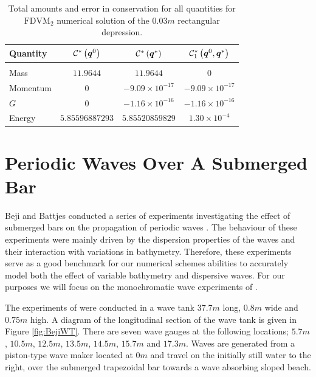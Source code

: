 \begin{table}
	\centering
	\begin{tabular}{l  c  c c}
		Quantity& $\mathcal{C}^*\left(\boldsymbol{q}^0\right)$ & $\mathcal{C}^*\left(\boldsymbol{q}^*\right)$ & $\mathcal{C}^*_1\left(\boldsymbol{q}^0,\boldsymbol{q}^*\right)$ \\
		\hline &&& \\
		Mass & $11.9644$ & $11.9644$ & $0$\\
		Momentum & $0$ & $-9.09 \times 10^{-17}$ & $-9.09 \times 10^{-17}$\\
		$G$ & $0$ & $-1.16\times 10^{-16}$ & $-1.16\times 10^{-16}$\\
		Energy & $5.85596887293$ & $5.85520859829 $ & $1.30 \times 10^{-4}$ \\
	\end{tabular}
	\caption{Total amounts and error in conservation for all quantities for $\text{FDVM}_2$ numerical solution of the $0.03m$ rectangular depression.}
	\label{tab:ConservationSegurFDVM3cm}
\end{table}  


\section{Periodic Waves Over A Submerged Bar}
\label{sec:PeriodicWavessubBar}
Beji and Battjes conducted a series of experiments investigating the effect of submerged bars on the propagation of periodic waves \cite{Beji-Battjes-1993-151,Beji-Battjes-1994-1}. The behaviour of these experiments were mainly driven by the dispersion properties of the waves and their interaction with variations in bathymetry. Therefore, these experiments serve as a good benchmark for our numerical schemes abilities to accurately model both the effect of variable bathymetry and dispersive waves. For our purposes we will focus on the monochromatic wave experiments of \citet{Beji-Battjes-1994-1}.

The experiments of \citet{Beji-Battjes-1994-1} were conducted in a wave tank $37.7m$ long, $0.8m$ wide and $0.75m$ high. A diagram of the longitudinal section of the wave tank is given in Figure \ref{fig:BejiWT}. There are seven wave gauges at the following locations; $5.7m$, $10.5m$, $12.5m$, $13.5m$, $14.5m$, $15.7m$ and $17.3m$. Waves are generated from a piston-type wave maker located at $0m$ and travel on the initially still water to the right, over the submerged trapezoidal bar towards a wave absorbing sloped beach.

